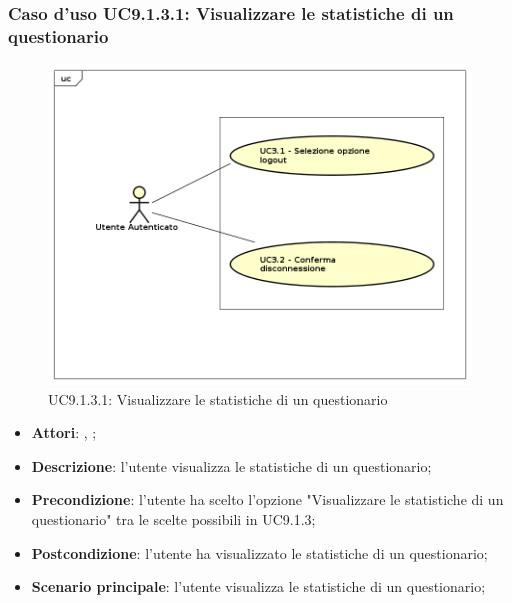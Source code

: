 				\subsubsection{Caso d'uso UC9.1.3.1: Visualizzare le statistiche di un questionario}
				\label{UC9.1.3.1}
				\begin{figure}[h]
					\centering
					\includegraphics[scale=0.5,keepaspectratio]{UML/UC9.png}
					\caption{UC9.1.3.1: Visualizzare le statistiche di un questionario}
				\end{figure}
				\FloatBarrier
				\begin{itemize}
					\item \textbf{Attori}: \uau, \uaupro; 
					\item \textbf{Descrizione}: l'utente visualizza le statistiche di un questionario;
					\item \textbf{Precondizione}: l'utente ha scelto l'opzione "Visualizzare le statistiche di un questionario" tra le scelte possibili in UC9.1.3;
					\item \textbf{Postcondizione}: l'utente ha visualizzato le statistiche di un questionario; 
					\item \textbf{Scenario principale}: l'utente visualizza le statistiche di un questionario;
				\end{itemize}
						

				
